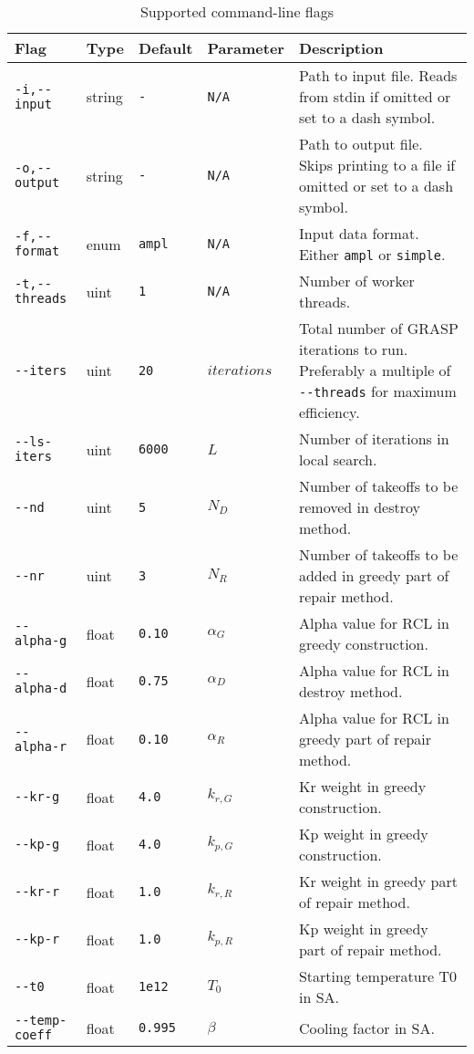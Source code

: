 \begin{table}[htbp]
\caption{Supported command-line flags}
\label{tbl:cli}
\fontsize{10.6pt}{13.3pt}\selectfont
\centering
\begin{tabularx}{\hsize}{@{}llllX@{}}
Flag & Type & Default & Parameter & Description \\
\midrule
\texttt{-i,-{}-input}   & string & \texttt{-}     & \texttt{N/A}       & Path to input file. Reads from stdin if omitted or set to a dash symbol. \\
\texttt{-o,-{}-output}  & string & \texttt{-}     & \texttt{N/A}       & Path to output file. Skips printing to a file if omitted or set to a dash symbol. \\
\texttt{-f,-{}-format}  & enum   & \texttt{ampl}  & \texttt{N/A}       & Input data format. Either \texttt{ampl} or \texttt{simple}. \\
\texttt{-t,-{}-threads} & uint   & \texttt{1}     & \texttt{N/A}       & Number of worker threads. \\
\texttt{-{}-iters}      & uint   & \texttt{20}    & $\mathit{iterations}$ & Total number of GRASP iterations to run. Preferably a multiple of \texttt{-{}-threads} for maximum efficiency. \\
\texttt{-{}-ls-iters}   & uint   & \texttt{6000}  & $L$                   & Number of iterations in local search. \\
\texttt{-{}-nd}         & uint   & \texttt{5}     & $N_D$                 & Number of takeoffs to be removed in destroy method. \\
\texttt{-{}-nr}         & uint   & \texttt{3}     & $N_R$                 & Number of takeoffs to be added in greedy part of repair method. \\
\texttt{-{}-alpha-g}    & float  & \texttt{0.10}  & $\alpha_G$            & Alpha value for RCL in greedy construction. \\
\texttt{-{}-alpha-d}    & float  & \texttt{0.75}  & $\alpha_D$            & Alpha value for RCL in destroy method. \\
\texttt{-{}-alpha-r}    & float  & \texttt{0.10}  & $\alpha_R$            & Alpha value for RCL in greedy part of repair method. \\
\texttt{-{}-kr-g}       & float  & \texttt{4.0}   & $k_{r, G}$            & Kr weight in greedy construction. \\
\texttt{-{}-kp-g}       & float  & \texttt{4.0}   & $k_{p, G}$            & Kp weight in greedy construction. \\
\texttt{-{}-kr-r}       & float  & \texttt{1.0}   & $k_{r, R}$            & Kr weight in greedy part of repair method. \\
\texttt{-{}-kp-r}       & float  & \texttt{1.0}   & $k_{p, R}$            & Kp weight in greedy part of repair method. \\
\texttt{-{}-t0}         & float  & \texttt{1e12}  & $T_0$                 & Starting temperature T0 in SA. \\
\texttt{-{}-temp-coeff} & float  & \texttt{0.995} & $\beta$               & Cooling factor in SA. \\
\end{tabularx}
\end{table}


